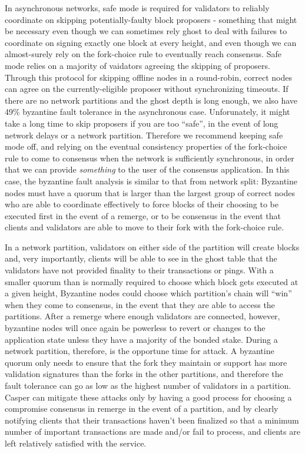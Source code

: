 \documentclass[11pt,a4paper]{article}
\begin{document}
In asynchronous networks, safe mode is required for validators to reliably coordinate on skipping potentially-faulty block proposers - something that might be necessary even though we can sometimes rely ghost to deal with failures to coordinate on signing exactly one block at every height, and even though we can almost-surely rely on the fork-choice rule to eventually reach consensus. Safe mode relies on a majority of vaidators agreeing the skipping of proposers. Through this protocol for skipping offline nodes in a round-robin, correct nodes can agree on the currently-eligible proposer without synchronizing timeouts. If there are no network partitions and the ghost depth is long enough, we also have 49\% byzantine fault tolerance in the asynchronous case.  Unforunately, it might take a long time to skip proposers if you are too ``safe'', in the event of long network delays or a network partition. Therefore we recommend keeping safe mode off, and relying on the eventual consistency properties of the fork-choice rule to come to consensus when the network is sufficiently synchronous, in order that we can provide \emph{something} to the user of the consensus application. In this case, the byzantine fault analysis is similar to that from network split: Byzantine nodes must have a quorum that is larger than the largest group of correct nodes who are able to coordinate effectively to force blocks of their choosing to be executed first in the event of a remerge, or to be consensus in the event that clients and validators are able to move to their fork with the fork-choice rule.

In a network partition, validators on either side of the partition will create blocks and, very importantly, clients will be able to see in the ghost table that the validators have not provided finality to their transactions or pings. With a smaller quorum than is normally required to choose which block gets executed at a given height, Byzantine nodes could choose which partition's chain will ``win'' when they come to consensus, in the event that they are able to access the partitions. After a remerge where enough validators are connected, however, byzantine nodes will once again be powerless to revert or changes to the application state unless they have a majority of the bonded stake. During a network partition, therefore, is the opportune time for attack. A byzantine quorum only needs to ensure that the fork they maintain or support has more validation signatures than the forks in the other partitions, and therefore the fault tolerance can go as low as the highest number of validators in a partition. Casper can mitigate these attacks only by having a good process for choosing a compromise consensus in remerge in the event of a partition, and by clearly notifying clients that their transactions haven't been finalized so that a minimum number of important transactions are made and/or fail to process, and clients are left relatively satisfied with the service.
\end{document}
